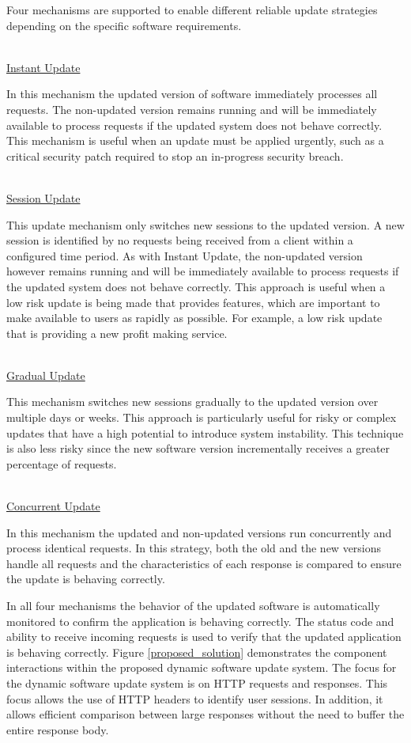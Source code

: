 \documentclass[a4paper,11pt,twoside]{report}
\begin{document}
Four mechanisms are supported to enable different reliable update strategies depending on the specific software requirements.

\noindent\\
\underline{Instant Update} 

\noindent
In this mechanism the updated version of software immediately processes all requests. The non-updated version remains running and will be immediately available to process requests if the updated system does not behave correctly. This mechanism is useful when an update must be applied urgently, such as a critical security patch required to stop an in-progress security breach.

\noindent\\
\underline{Session Update}

\noindent
This update mechanism only switches new sessions to the updated version. A new session is identified by no requests being received from a client within a configured time period. As with Instant Update, the non-updated version however remains running and will be immediately available to process requests if the updated system does not behave correctly. This approach is useful when a low risk update is being made that provides features, which are important to make available to users as rapidly as possible. For example, a low risk update that is providing a new profit making service.

\noindent\\
\underline{Gradual Update}

\noindent
This mechanism switches new sessions gradually to the updated version over multiple days or weeks. This approach is particularly useful for risky or complex updates that have a high potential to introduce system instability. This technique is also less risky since the new software version incrementally receives a greater percentage of requests.

\noindent\\
\underline{Concurrent Update}

\noindent
In this mechanism the updated and non-updated versions run concurrently and process identical requests.  In this strategy, both the old and the new versions handle all requests and the characteristics of each response is compared to ensure the update is behaving correctly.

In all four mechanisms the behavior of the updated software is automatically monitored to confirm the application is behaving correctly. The status code and ability to receive incoming requests is used to verify that the updated application is behaving correctly. Figure \ref{proposed_solution} demonstrates the component interactions within the proposed dynamic software update system. The focus for the dynamic software update system is on HTTP requests and responses.  This focus allows the use of HTTP headers to identify user sessions.  In addition, it allows efficient comparison between large responses without the need to buffer the entire response body.
\end{document}
